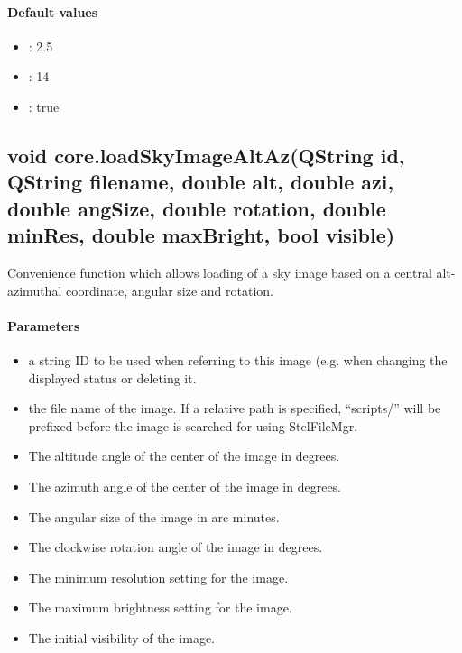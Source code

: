 \paragraph{Default values}
\begin{itemize}
\item {}: 2.5
\item {}: 14
\item {}: true
\end{itemize}

\subsection{void core.loadSkyImageAltAz(QString id, QString filename, double alt, double azi, double angSize, double rotation, double minRes, double maxBright, bool visible)}
\label{sec:ScriptingAPI:core:loadSkyImageAltAz}
Convenience function which allows loading of a sky image based on a central alt-azimuthal coordinate, angular size and rotation.

\paragraph{Parameters}
\begin{itemize}
\item {} a string ID to be used when referring to this image (e.g. when changing the displayed status or deleting it.
\item {} the file name of the image. If a relative path is specified, ``scripts/'' will be prefixed before the image is searched for using StelFileMgr.
\item {} The altitude angle of the center of the image in degrees.
\item {} The azimuth angle of the center of the image in degrees.
\item {} The angular size of the image in arc minutes.
\item {} 	The clockwise rotation angle of the image in degrees.
\item {} The minimum resolution setting for the image.
\item {} The maximum brightness setting for the image.
\item {} The initial visibility of the image.
\end{itemize}

